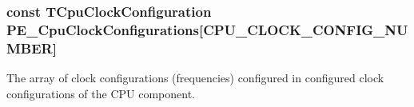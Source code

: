 \subsubsection[{P\+E\+\_\+\+Cpu\+Clock\+Configurations}]{\setlength{\rightskip}{0pt plus 5cm}const {\bf T\+Cpu\+Clock\+Configuration} P\+E\+\_\+\+Cpu\+Clock\+Configurations\mbox{[}C\+P\+U\+\_\+\+C\+L\+O\+C\+K\+\_\+\+C\+O\+N\+F\+I\+G\+\_\+\+N\+U\+M\+B\+E\+R\mbox{]}}\label{group___cpu__module_gab69281f0e90d16198a5595ed7f471441}
The array of clock configurations (frequencies) configured in configured clock configurations of the C\+P\+U component. 